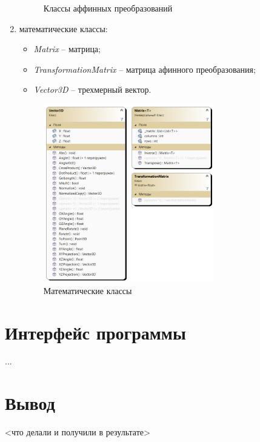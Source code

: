 \begin{enumerate}
\begin{figure}[h]
		\caption{Классы аффинных преобразований} 
		\label{fig:transformation-class} 
	\end{figure}
	\item математические классы:
	\begin{itemize}[label=--]
		\item \textit{Matrix} -- матрица;
		\item \textit{TransformationMatrix} -- матрица афинного преобразования;
		\item \textit{Vector3D} -- трехмерный вектор.
	\end{itemize}
	\begin{figure}[h] 
		\centering
		\includegraphics[width=0.7\textwidth]{images/math-class.png}
		\caption{Математические классы} 
		\label{fig:math-class} 
	\end{figure}
\end{enumerate}


\section{Интерфейс программы}

...

\section*{Вывод}

<что делали и получили в результате>

\clearpage
